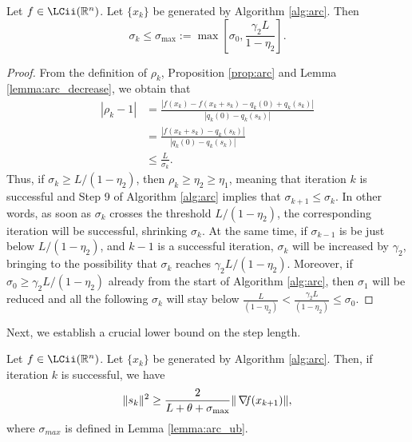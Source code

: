 \documentclass[10pt,a4paper]{article}
\begin{document}
\begin{lemma}\label{lemma:arc_ub}
	Let $f\in \LCii(\Rn)$. Let $\{x_k\}$ be generated by Algorithm \ref{alg:arc}. Then
	\begin{equation*}
		\sigma_k \leq \sigma_{\max} :=\max \left[ \sigma_0, \frac{\gamma_2 L}{1 - \eta_2} \right].
	\end{equation*}
\end{lemma}
\begin{proof}
	From the definition of $\rho_k$, Proposition \ref{prop:arc} and Lemma \ref{lemma:arc_decrease}, we obtain that
	\begin{align*}
		|\rho_k - 1| &= \frac{|f(x_k) - f(x_k + s_k) - q_k(0) + q_k(s_k)|}{|q_k(0) - q_k(s_k)|} \\
		&= \frac{|f(x_k + s_k) - q_k(s_k)|}{|q_k(0) - q_k(s_k)|} \\
		&\leq \frac{L}{\sigma_k}.
	\end{align*}
	Thus, if $\sigma_k \geq L/(1 - \eta_2)$, then $\rho_k \geq \eta_2\geq\eta_1$, meaning that iteration $k$ is successful and Step 9 of Algorithm \ref{alg:arc} implies that $\sigma_{k+1} \leq \sigma_k$. In other words, as soon as $\sigma_k$ crosses the threshold $L/(1 - \eta_2)$, the corresponding iteration will be successful, shrinking $\sigma_k$. At the same time, if $\sigma_{k-1}$ is be just below $L/(1 - \eta_2)$, and $k-1$ is a successful iteration, $\sigma_k$ will be increased by $\gamma_2$, bringing to the possibility that $\sigma_k$ reaches $\gamma_2L/(1 - \eta_2)$. Moreover, if $\sigma_0\geq \gamma_2L/(1 - \eta_2)$ already from the start of Algorithm \ref{alg:arc}, then $\sigma_1$ will be reduced and all the following $\sigma_k$ will stay below $\frac{L}{(1 - \eta_2)}<\frac{\gamma_2L}{(1 - \eta_2)}\leq \sigma_0$. 	 
\end{proof}

\noindent Next, we establish a crucial lower bound on the step length.

\begin{lemma}\label{lemma:arc_lb}
	Let $f\in \LCii(\Rn)$. Let $\{x_k\}$ be generated by Algorithm \ref{alg:arc}. Then, if iteration $k$ is successful, we have
	\begin{equation*}
		\|s_k\|^2 \geq \frac{2}{L + \theta + \sigma_{\max}} \|\operatorname*{\mathit{\nabla \!f}}(x_{k+1})\|,
	\end{equation*}
where $\sigma_{max}$ is defined in Lemma \ref{lemma:arc_ub}.
\end{lemma}
\end{document}
